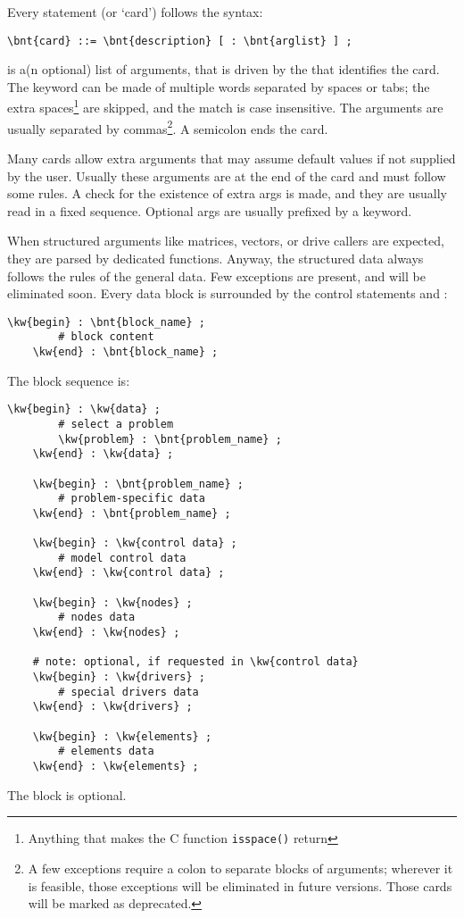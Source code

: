 Every statement (or `card') follows the syntax:
\begin{Verbatim}[commandchars=\\\{\}]
    \bnt{card} ::= \bnt{description} [ : \bnt{arglist} ] ;
\end{Verbatim}
 is a(n optional) list of arguments, that is driven by the
 that identifies the card.
The keyword can be made of multiple words separated by spaces or tabs;
the extra spaces\footnote{
	Anything that makes the C function \texttt{isspace()}
	return 
} are skipped, and the match is case insensitive.
The arguments are usually separated by commas\footnote{
	A few exceptions require a colon to separate blocks of arguments;
	wherever it is feasible, those exceptions will be eliminated
	in future versions.
	Those cards will be marked as deprecated.
}.
A semicolon ends the card.

Many cards allow extra arguments that may assume default values
if not supplied by the user.
Usually these arguments are at the end of the card
and must follow some rules.
A check for the existence of extra args is made,
and they are usually read in a fixed sequence.
Optional args are usually prefixed by a keyword.

When structured arguments like matrices, vectors, or drive callers are
expected, they are parsed by dedicated functions.
Anyway, the structured data always follows the rules of the general data.
Few exceptions are present, and will be eliminated soon.
Every data block is surrounded by the control statements  and
:
\begin{Verbatim}[commandchars=\\\{\}]
    \kw{begin} : \bnt{block_name} ;
        # block content
    \kw{end} : \bnt{block_name} ;
\end{Verbatim}
The block sequence is:
\begin{Verbatim}[commandchars=\\\{\}]
    \kw{begin} : \kw{data} ;
        # select a problem
        \kw{problem} : \bnt{problem_name} ;
    \kw{end} : \kw{data} ;

    \kw{begin} : \bnt{problem_name} ;
        # problem-specific data
    \kw{end} : \bnt{problem_name} ;

    \kw{begin} : \kw{control data} ;
        # model control data
    \kw{end} : \kw{control data} ;

    \kw{begin} : \kw{nodes} ;
        # nodes data
    \kw{end} : \kw{nodes} ;

    # note: optional, if requested in \kw{control data}
    \kw{begin} : \kw{drivers} ;
        # special drivers data
    \kw{end} : \kw{drivers} ;

    \kw{begin} : \kw{elements} ;
        # elements data
    \kw{end} : \kw{elements} ;
\end{Verbatim}
The  block is optional.

